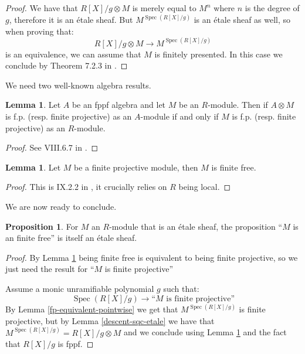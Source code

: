 \documentclass[10pt,a4paper]{article}
\theoremstyle{definition}
\newtheorem{lemma}[theorem]{Lemma}
\newtheorem{proposition}[theorem]{Proposition}
\DeclareMathOperator{\Spec}{Spec}
\begin{document}
\begin{proof}
We have that $R[X]/g\otimes M$ is merely equal to $M^n$ where $n$ is the degree of $g$, therefore it is an \'etale sheaf. But $M^{\Spec(R[X]/g)}$ is an \'etale sheaf as well, so when proving that:
\[R[X]/g\otimes M \to M^{\Spec(R[X]/g)}\]
is an equivalence, we can assume that $M$ is finitely presented. In this case we conclude by Theorem 7.2.3 in \cite{draft}.
\end{proof}

We need two well-known algebra results.

\begin{lemma}\label{fp-stable-etale-tensor}
  Let $A$ be an fppf algebra and let $M$ be an $R$-module. Then if $A\otimes M$ is f.p. (resp. finite projective)
  as an $A$-module if and only if $M$ is f.p. (resp. finite projective) as an $R$-module.
\end{lemma}

\begin{proof}
See VIII.6.7 in \cite{lombardi-quitte}.
\end{proof}

\begin{lemma}\label{finite-projective-free}
Let $M$ be a finite projective module, then $M$ is finite free.
\end{lemma}

\begin{proof}
This is IX.2.2 in \cite{lombardi-quitte}, it crucially relies on $R$ being local.
\end{proof}

We are now ready to conclude.

\begin{proposition}\label{descent-finite-free}
For $M$ an $R$-module that is an \'etale sheaf, the proposition ``$M$ is an finite free'' is itself an \'etale sheaf.
\end{proposition}

\begin{proof}
By Lemma \ref{finite-projective-free} being finite free is equivalent to being finite projective, so we just need the result for ``$M$ is finite projective''

Assume a monic unramifiable polynomial $g$ such that:
\[\Spec(R[X]/g) \to \textrm{``$M$ is finite projective''}\]
By Lemma \ref{fp-equivalent-pointwise} we get that $M^{\Spec(R[X]/g)}$ is finite projective, but by Lemma \ref{descent-sqc-etale} we have that $M^{\Spec(R[X]/g)} = R[X]/g\otimes M$ and we conclude using Lemma \ref{fp-stable-etale-tensor} and the fact that $R[X]/g$ is fppf.
\end{proof}
\end{document}
